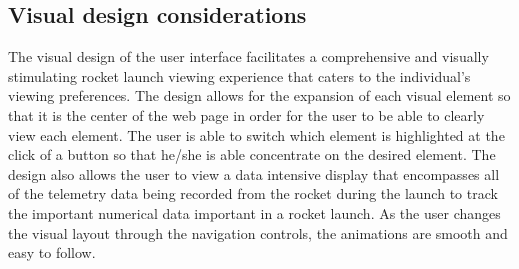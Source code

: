 \subsection{Visual design considerations}
  The visual design of the user interface facilitates a comprehensive and
  visually stimulating rocket launch viewing experience that caters to the
  individual's viewing preferences. The design allows for the expansion of
  each visual element so that it is the center of the web page in order for the
  user to be able to clearly view each element. The user is able to switch
  which element is highlighted at the click of a button so that he/she is able
  concentrate on the desired element. The design also allows the user to view
  a data intensive display that encompasses all of the telemetry data being recorded
  from the rocket during the launch to track the important numerical data important
  in a rocket launch. As the user changes the visual layout through the navigation
  controls, the animations are smooth and easy to follow.
